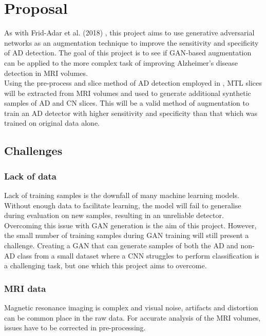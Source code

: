 \documentclass[
    author={Kai Hulme},
    supervisor={Dr Jon Bird},
    degree={BSc},
    title={Generative Adversarial Networks as an Augmentation Technique},
    subtitle={for Alzheimer's Disease Detection in MRI Volumes},
    type={Research},
    year={2021} 
]{dissertation}
\begin{document}

\section{Proposal}

As with Frid-Adar et al. (2018) \cite{frid2018gan}, this project aims to use generative adversarial networks as an augmentation technique to improve the sensitivity and specificity of AD detection. The goal of this project is to see if GAN-based augmentation can be applied to the more complex task of improving Alzheimer's disease detection in MRI volumes. 
\\ 

Using the pre-process and slice method of AD detection employed in \cite{bae2020identification}, MTL slices will be extracted from MRI volumes and used to generate additional synthetic samples of AD and CN slices. This will be a valid method of augmentation to train an AD detector with higher sensitivity and specificity than that which was trained on original data alone.

\subsection{Challenges}

\subsubsection{Lack of data}

Lack of training samples is the downfall of many machine learning models. Without enough data to facilitate learning, the model will fail to generalise during evaluation on new samples, resulting in an unreliable detector. 
\\

Overcoming this issue with GAN generation is the aim of this project. However, the small number of training samples during GAN training will still present a challenge. Creating a GAN that can generate samples of both the AD and non-AD class from a small dataset where a CNN struggles to perform classification is a challenging task, but one which this project aims to overcome.

\subsubsection{MRI data}

Magnetic resonance imaging is complex and visual noise, artifacts and distortion can be common place in the raw data. For accurate analysis of the MRI volumes, issues have to be corrected in pre-processing.
\\
\end{document}
